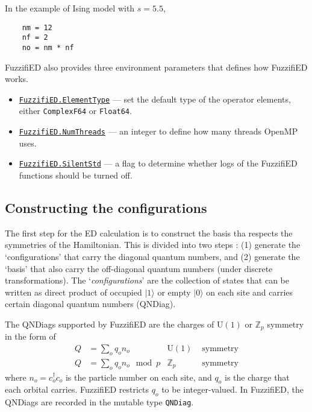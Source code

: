 \documentclass{timesjhep}
\begin{document}
In the example of Ising model with $s=5.5$,
\begin{lstlisting}
    nm = 12
    nf = 2
    no = nm * nf
\end{lstlisting}

FuzzifiED also provides three environment parameters that defines how FuzzifiED works.
\begin{itemize}
    \item \href{https://docs.fuzzified.world/core/\#FuzzifiED.ElementType}{\lstinline|FuzzifiED.ElementType|} --- set the default type of the operator elements, either \lstinline|ComplexF64| or \lstinline|Float64|.
    \item \href{https://docs.fuzzified.world/core/\#FuzzifiED.NumThreads}{\lstinline|FuzzifiED.NumThreads|} --- an integer to define how many threads OpenMP uses.
    \item \href{https://docs.fuzzified.world/core/\#FuzzifiED.SilentStd}{\lstinline|FuzzifiED.SilentStd|} --- a flag to determine whether logs of the FuzzifiED functions should be turned off. 
\end{itemize}

\subsection{Constructing the configurations}
\label{sec:ed_confs}

The first step for the ED calculation is to construct the basis tha respects the symmetries of the Hamiltonian. This is divided into two steps : (1) generate the `configurations' that carry the diagonal quantum numbers, and (2) generate the `basis' that also carry the off-diagonal quantum numbers (under discrete transformations). The `\textit{configurations}' are the collection of states that can be written as direct product of occupied $|1\rangle$ or empty $|0\rangle$ on each site and carries certain diagonal quantum numbers (QNDiag). 

The QNDiags supported by FuzzifiED are the charges of $\mathrm{U}(1)$ or $\mathbb{Z}_p$ symmetry in the form of 
\begin{align}
    Q&=\sum_oq_on_o&\mathrm{U}(1)&\textrm{ symmetry}\nonumber\\
    Q&=\sum_oq_on_o\mod p&\mathbb{Z}_p&\textrm{ symmetry}
\end{align}
where $n_o=c^\dagger_oc_o$ is the particle number on each site, and $q_o$ is the charge that each orbital carries. FuzzifiED restricts $q_o$ to be integer-valued. In FuzzifiED, the QNDiags are recorded in the mutable type \lstinline|QNDiag|.
\end{document}
